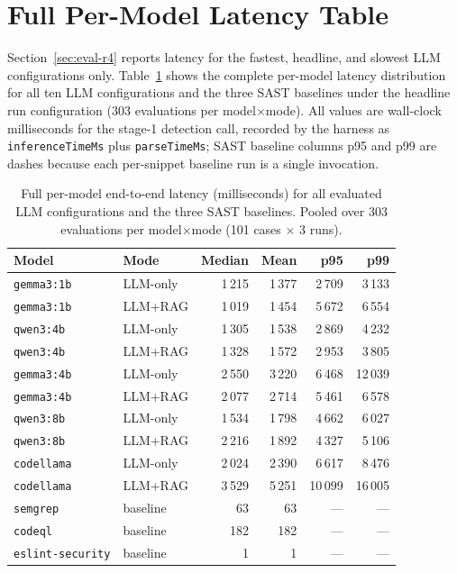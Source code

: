 \section{Full Per-Model Latency Table}
\label{app:full-latency}

Section~\ref{sec:eval-r4} reports latency for the fastest, headline, and slowest LLM configurations only. Table~\ref{tab:r4-latency-full} shows the complete per-model latency distribution for all ten LLM configurations and the three SAST baselines under the headline run configuration (303 evaluations per model$\times$mode). All values are wall-clock milliseconds for the stage-1 detection call, recorded by the harness as \texttt{inferenceTimeMs} plus \texttt{parseTimeMs}; SAST baseline columns p95 and p99 are dashes because each per-snippet baseline run is a single invocation.

\begin{table}[H]
\centering
\caption[Full per-model end-to-end latency for all evaluated configurations.]{Full per-model end-to-end latency (milliseconds) for all evaluated LLM configurations and the three SAST baselines. Pooled over 303 evaluations per model$\times$mode (101 cases $\times$ 3 runs).}
\label{tab:r4-latency-full}
\footnotesize
\begin{tabular}{@{}llrrrr@{}}
\toprule
\textbf{Model} & \textbf{Mode} & \textbf{Median} & \textbf{Mean} & \textbf{p95} & \textbf{p99} \\
\midrule
\texttt{gemma3:1b} & LLM-only & 1\,215 & 1\,377 & 2\,709 & 3\,133 \\
\texttt{gemma3:1b} & LLM+RAG  & 1\,019 & 1\,454 & 5\,672 & 6\,554 \\
\texttt{qwen3:4b}  & LLM-only & 1\,305 & 1\,538 & 2\,869 & 4\,232 \\
\texttt{qwen3:4b}  & LLM+RAG  & 1\,328 & 1\,572 & 2\,953 & 3\,805 \\
\texttt{gemma3:4b} & LLM-only & 2\,550 & 3\,220 & 6\,468 & 12\,039 \\
\texttt{gemma3:4b} & LLM+RAG  & 2\,077 & 2\,714 & 5\,461 & 6\,578 \\
\texttt{qwen3:8b}  & LLM-only & 1\,534 & 1\,798 & 4\,662 & 6\,027 \\
\texttt{qwen3:8b}  & LLM+RAG  & 2\,216 & 1\,892 & 4\,327 & 5\,106 \\
\texttt{codellama} & LLM-only & 2\,024 & 2\,390 & 6\,617 & 8\,476 \\
\texttt{codellama} & LLM+RAG  & 3\,529 & 5\,251 & 10\,099 & 16\,005 \\
\midrule
\texttt{semgrep}         & baseline & 63  & 63  & --- & --- \\
\texttt{codeql}          & baseline & 182 & 182 & --- & --- \\
\texttt{eslint-security} & baseline & 1   & 1   & --- & --- \\
\bottomrule
\end{tabular}
\end{table}

